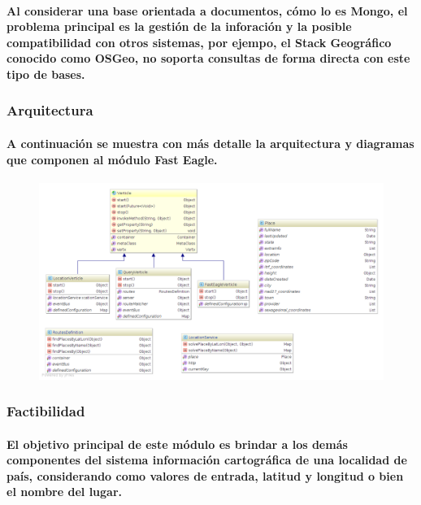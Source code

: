       \paragraph{Al considerar una base orientada a documentos, cómo lo es Mongo, el problema principal es la gestión de la inforación y la posible compatibilidad con otros sistemas, por ejempo, el Stack Geográfico conocido como OSGeo\cite{38}, no soporta consultas de forma directa con este tipo de bases.}
    \subsubsection{Arquitectura}
      \paragraph{A continuación se muestra con más detalle la arquitectura y diagramas que componen al módulo Fast Eagle. }
      \begin{figure}[h!]
          \centering
            \includegraphics[width=\textwidth]{./images/FastEagleClassDiagram.png}
      \end{figure}
    \subsubsection{Factibilidad}      
      \paragraph{El objetivo principal de este módulo es brindar a los demás componentes del sistema información cartográfica de una localidad de país, considerando como valores de entrada, latitud y longitud o bien el nombre del lugar.}
